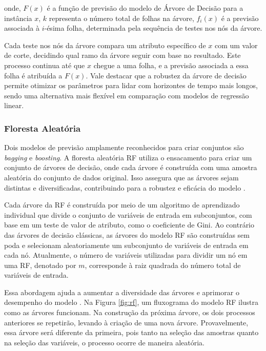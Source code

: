 \noindent onde, $ F(x) $ é a função de previsão do modelo de Árvore de Decisão para a instância $ x $, $ k $ representa o número total de folhas na árvore, $ f_i(x) $ é a previsão associada à $ i $-ésima folha, determinada pela sequência de testes nos nós da árvore.

Cada teste nos nós da árvore compara um atributo específico de $ x $ com um valor de corte, decidindo qual ramo da árvore seguir com base no resultado. Este processo continua até que $ x $ chegue a uma folha, e a previsão associada a essa folha é atribuída a $ F(x) $. Vale destacar que a robustez da árvore de decisão permite otimizar os parâmetros para lidar com horizontes de tempo mais longos, sendo uma alternativa mais flexível em comparação com modelos de regressão linear.
 
 
  
 \subsubsection{Floresta Aleat\'oria} \label{subsubsec:rf}
 
Dois modelos de previsão amplamente reconhecidos para criar conjuntos são \textit{bagging} e \textit{boosting}. A floresta aleatória RF utiliza o ensacamento para criar um conjunto de árvores de decisão, onde cada árvore é construída com uma amostra aleatória do conjunto de dados original. Isso assegura que as árvores sejam distintas e diversificadas, contribuindo para a robustez e eficácia do modelo \cite{SEMAN2023109269}.
 
 Cada árvore da RF é construída por meio de um algoritmo de aprendizado individual que divide o conjunto de variáveis de entrada em subconjuntos, com base em um teste de valor de atributo, como o coeficiente de Gini. Ao contrário das árvores de decisão clássicas, as árvores do modelo RF são construídas sem poda e selecionam aleatoriamente um subconjunto de variáveis de entrada em cada nó. Atualmente, o número de variáveis utilizadas para dividir um nó em uma RF, denotado por $m$, corresponde à raiz quadrada do número total de variáveis de entrada. 
 
 Essa abordagem ajuda a aumentar a diversidade das árvores e aprimorar o desempenho do modelo \cite{Pelletier2016156}. Na Figura \ref{fig:rf}, um fluxograma do modelo RF ilustra como as árvores funcionam.
 Na construção da próxima árvore, os dois processos anteriores se repetirão, levando à criação de uma nova árvore. Provavelmente, essa árvore será diferente da primeira, pois tanto na seleção das amostras quanto na seleção das variáveis, o processo ocorre de maneira aleatória.
  
